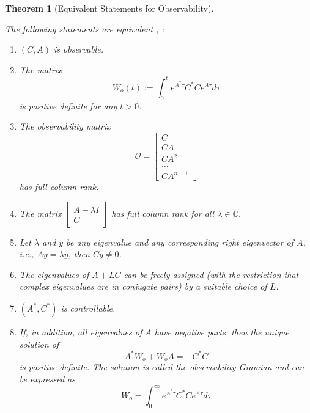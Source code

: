 \documentclass[
]{book}
\newtheorem{theorem}{Theorem}[chapter]
\theoremstyle{definition}
\theoremstyle{definition}
\theoremstyle{definition}
\theoremstyle{definition}
\theoremstyle{remark}
\begin{document}
\begin{theorem}[Equivalent Statements for Observability]
\protect\hypertarget{thm:ltiobservable}{}\label{thm:ltiobservable}

The following statements are equivalent \citep{chen1984book-linear}, \citep{zhou1996book-robust}:

\begin{enumerate}
\def\labelenumi{\arabic{enumi}.}
\item
  \((C, A)\) is observable.
\item
  The matrix
  \begin{equation*}
  W_o(t) := \int_{0}^{t} e^{A^*\tau} C^* C e^{A\tau} d\tau
  \end{equation*}
  is positive definite for any \(t>0\).
\item
  The observability matrix
  \begin{equation*}
  \mathcal{O} = \begin{bmatrix}
     C \\ CA \\ CA^2 \\ \dots \\ CA^{n-1}
  \end{bmatrix}
  \end{equation*}
  has full column rank.
\item
  The matrix \(\begin{bmatrix}
  A - \lambda I \\ C
  \end{bmatrix}\) has full column rank for all \(\lambda \in \mathbb{C}\).
\item
  Let \(\lambda\) and \(y\) be any eigenvalue and any corresponding right eigenvector of \(A\), i.e., \(Ay = \lambda y\), then \(Cy \ne 0\).
\item
  The eigenvalues of \(A+LC\) can be freely assigned (with the restriction that complex eigenvalues are in conjugate pairs) by a suitable choice of \(L\).
\item
  \((A^*, C^*)\) is controllable.
\item
  If, in addition, all eigenvalues of \(A\) have negative parts, then the unique solution of
  \begin{equation*} 
  A^* W_o + W_o A = -C^* C 
  \end{equation*}
  is positive definite. The solution is called the \emph{observability Gramian} and can be expressed as
  \begin{equation*}
  W_o = \int_{0}^{\infty} e^{A^*\tau} C^* C e^{A\tau} d\tau
  \end{equation*}
\end{enumerate}

\end{theorem}
\end{document}
